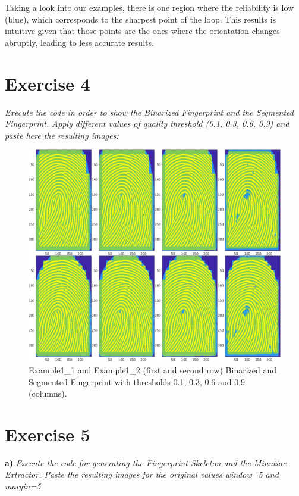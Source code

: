 \documentclass[11pt]{article}
\begin{document}
Taking a look into our examples, there is one region where the reliability is low (blue), which corresponds to the sharpest point of the loop. This results is intuitive given that those points are the ones where the orientation changes abruptly, leading to less accurate results.


\section{Exercise 4}

\emph{Execute the code in order to show the Binarized Fingerprint and the Segmented Fingerprint. Apply different values of quality threshold (0.1, 0.3, 0.6, 0.9) and paste here the resulting images:}

\begin{figure}
  \centering
  \includegraphics[scale=0.5]{img/merge_bin}
  \caption{Example1\_1 and Example1\_2 (first and second row) Binarized and Segmented Fingerprint with thresholds 0.1, 0.3, 0.6 and 0.9 (columns).}
\end{figure}

\section{Exercise 5}

\textbf{a) }\emph{Execute the code for generating the Fingerprint Skeleton and the Minutiae Extractor. Paste the resulting images for the original values window=5 and margin=5.}
\end{document}
